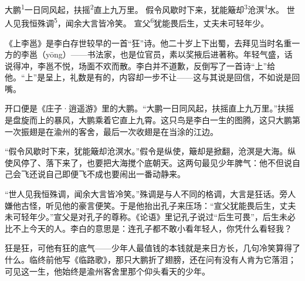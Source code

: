 
\begin{poem}
大鹏\textsuperscript{1}一日同风起，扶摇\textsuperscript{2}直上九万里。
假令风歇时下来，犹能簸却\textsuperscript{3}沧溟\textsuperscript{4}水。
世人见我恒殊调\textsuperscript{5}，闻余大言皆冷笑。
宣父\textsuperscript{6}犹能畏后生，丈夫未可轻年少。
\end{poem}

\begin{annotations}
\end{annotations}

\begin{appreciation}
《上李邕》是李白存世较早的一首“狂”诗。他二十岁上下出蜀，去拜见当时名重一方的李邕（yōng）——书法家，也是位官员，素以奖掖后进著称。年轻气盛，话说得冲，李邕不悦，场面不欢而散。李白并不道歉，反倒写了一首诗“上”给他。“上”是呈上，礼数是有的，内容却一步不让——这与其说是回信，不如说是回嘴。

开口便是《庄子·逍遥游》里的大鹏。“大鹏一日同风起，扶摇直上九万里。”扶摇是盘旋而上的暴风，大鹏乘着它直上九霄。这只鸟是李白一生的图腾，这只大鹏第一次振翅是在渝州的客舍，最后一次收翅是在当涂的江边。

“假令风歇时下来，犹能簸却沧溟水。”假令是纵使，簸却是掀翻，沧溟是大海。纵使风停了、落下来了，也要把大海搅个底朝天。这两句最见少年脾气：他不但说自己会飞还说自己即便飞不成也要闹出一番动静来。

“世人见我恒殊调，闻余大言皆冷笑。”殊调是与人不同的格调，大言是狂话。旁人嫌他古怪，听见他的豪言便笑。于是他抬出孔子来压场：“宣父犹能畏后生，丈夫未可轻年少。”宣父是对孔子的尊称。《论语》里记孔子说过“后生可畏”，后生未必比不上今天的人。李白的意思是：连孔子都不敢小看年轻人，你凭什么看轻我？

狂是狂，可他有狂的底气——少年人最值钱的本钱就是来日方长，几句冷笑算得了什么。临终前他写《临路歌》，那只大鹏折了翅膀，还在问有没有人肯为它落泪；可见这一生，他始终是渝州客舍里那个仰头看天的少年。
\end{appreciation}

